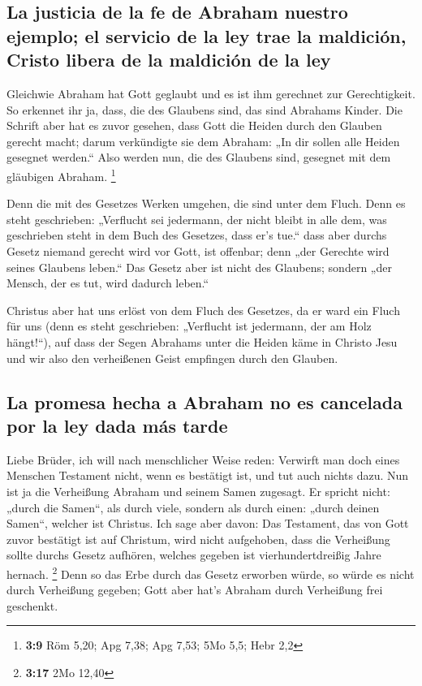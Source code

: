 \hypertarget{la-justicia-de-la-fe-de-abraham-nuestro-ejemplo-el-servicio-de-la-ley-trae-la-maldiciuxf3n-cristo-libera-de-la-maldiciuxf3n-de-la-ley}{%
\subsection{La justicia de la fe de Abraham nuestro ejemplo; el servicio
de la ley trae la maldición, Cristo libera de la maldición de la
ley}\label{la-justicia-de-la-fe-de-abraham-nuestro-ejemplo-el-servicio-de-la-ley-trae-la-maldiciuxf3n-cristo-libera-de-la-maldiciuxf3n-de-la-ley}}

 Gleichwie Abraham hat Gott geglaubt und es ist ihm
gerechnet zur Gerechtigkeit.  So erkennet ihr ja, dass,
die des Glaubens sind, das sind Abrahams Kinder.  Die
Schrift aber hat es zuvor gesehen, dass Gott die Heiden durch den
Glauben gerecht macht; darum verkündigte sie dem Abraham: „In dir sollen
alle Heiden gesegnet werden.``  Also werden nun, die des
Glaubens sind, gesegnet mit dem gläubigen Abraham. \footnote{\textbf{3:9}
  Röm 5,20; Apg 7,38; Apg 7,53; 5Mo 5,5; Hebr 2,2}

 Denn die mit des Gesetzes Werken umgehen, die sind unter
dem Fluch. Denn es steht geschrieben: „Verflucht sei jedermann, der
nicht bleibt in alle dem, was geschrieben steht in dem Buch des
Gesetzes, dass er's tue.``  dass aber durchs Gesetz
niemand gerecht wird vor Gott, ist offenbar; denn „der Gerechte wird
seines Glaubens leben.``  Das Gesetz aber ist nicht des
Glaubens; sondern „der Mensch, der es tut, wird dadurch leben.``

 Christus aber hat uns erlöst von dem Fluch des Gesetzes,
da er ward ein Fluch für uns (denn es steht geschrieben: „Verflucht ist
jedermann, der am Holz hängt!{}``),  auf dass der Segen
Abrahams unter die Heiden käme in Christo Jesu und wir also den
verheißenen Geist empfingen durch den Glauben.

\hypertarget{la-promesa-hecha-a-abraham-no-es-cancelada-por-la-ley-dada-muxe1s-tarde}{%
\subsection{La promesa hecha a Abraham no es cancelada por la ley dada
más
tarde}\label{la-promesa-hecha-a-abraham-no-es-cancelada-por-la-ley-dada-muxe1s-tarde}}

 Liebe Brüder, ich will nach menschlicher Weise reden:
Verwirft man doch eines Menschen Testament nicht, wenn es bestätigt ist,
und tut auch nichts dazu.  Nun ist ja die Verheißung
Abraham und seinem Samen zugesagt. Er spricht nicht: „durch die Samen``,
als durch viele, sondern als durch einen: „durch deinen Samen``, welcher
ist Christus.  Ich sage aber davon: Das Testament, das
von Gott zuvor bestätigt ist auf Christum, wird nicht aufgehoben, dass
die Verheißung sollte durchs Gesetz aufhören, welches gegeben ist
vierhundertdreißig Jahre hernach. \footnote{\textbf{3:17} 2Mo 12,40}
 Denn so das Erbe durch das Gesetz erworben würde, so
würde es nicht durch Verheißung gegeben; Gott aber hat's Abraham durch
Verheißung frei geschenkt.

